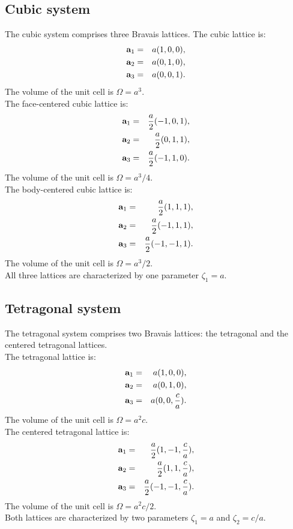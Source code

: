 \documentclass[12pt,a4paper]{article}
\begin{document}
\subsection{\color{web-blue}Cubic system}
The cubic system comprises three Bravais lattices. The cubic lattice
is:
\begin{eqnarray}
{\bf a}_1 &=& a (1, 0, 0), \nonumber \\
{\bf a}_2 &=& a (0, 1, 0), \nonumber \\
{\bf a}_3 &=& a (0, 0, 1). \nonumber
\nonumber
\end{eqnarray}
The volume of the unit cell is $\Omega = a^3$. \\
The face-centered cubic lattice is:
\begin{eqnarray}
{\bf a}_1 &=& {a \over 2} (-1, 0, 1), \nonumber \\
{\bf a}_2 &=& {a \over 2} (0, 1, 1), \nonumber \\
{\bf a}_3 &=& {a \over 2} (-1, 1, 0). \nonumber
\nonumber
\end{eqnarray}
The volume of the unit cell is $\Omega = a^3/4$. \\
The body-centered cubic lattice is:
\begin{eqnarray}
{\bf a}_1 &=&{a \over 2} (1, 1, 1), \nonumber \\
{\bf a}_2 &=&{a \over 2} (-1, 1, 1), \nonumber \\
{\bf a}_3 &=&{a \over 2} (-1, -1, 1). \nonumber
\nonumber
\end{eqnarray}
The volume of the unit cell is $\Omega = a^3/2$. \\
All three lattices are characterized by one parameter $\zeta_1=a$.

\subsection{\color{web-blue}Tetragonal system}
The tetragonal system comprises two Bravais lattices: the tetragonal
and the centered tetragonal lattices.\\
The tetragonal lattice is:
\begin{eqnarray}
{\bf a}_1 &=& a (1, 0, 0), \nonumber \\
{\bf a}_2 &=& a (0, 1, 0), \nonumber \\
{\bf a}_3 &=& a (0, 0, {c\over a}). \nonumber
\nonumber
\end{eqnarray}
The volume of the unit cell is $\Omega = a^2c$. \\
The centered tetragonal lattice is:
\begin{eqnarray}
{\bf a}_1 &=& {a \over 2} (1, -1, {c\over a}), \nonumber \\
{\bf a}_2 &=& {a \over 2} (1, 1, {c\over a}), \nonumber \\
{\bf a}_3 &=& {a \over 2} (-1, -1, {c\over a}). \nonumber
\nonumber
\end{eqnarray}
The volume of the unit cell is $\Omega = a^2c/2$. \\
Both lattices are characterized by two parameters $\zeta_1=a$ and 
$\zeta_2=c/a$.
\end{document}
